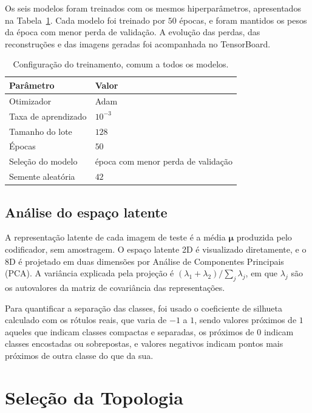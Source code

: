 \documentclass[11pt,a4paper]{article}
\begin{document}
Os seis modelos foram treinados com os mesmos hiperparâmetros, apresentados na
Tabela~\ref{tab:config}. Cada modelo foi treinado por $50$ épocas, e foram
mantidos os pesos da época com menor perda de validação. A evolução das perdas, das reconstruções e das imagens geradas
foi acompanhada no TensorBoard.

\begin{table}[H]
  \centering
  \small
  \begin{tabular}{ll}
    \toprule
    Parâmetro & Valor \\
    \midrule
    Otimizador & Adam \\
    Taxa de aprendizado & $10^{-3}$ \\
    Tamanho do lote & $128$ \\
    Épocas & $50$ \\
    Seleção do modelo & época com menor perda de validação \\
    Semente aleatória & $42$ \\
    \bottomrule
  \end{tabular}
  \caption{Configuração do treinamento, comum a todos os modelos.}
  \label{tab:config}
\end{table}

\subsection{Análise do espaço latente}

A representação latente de cada imagem de teste é a média $\boldsymbol{\mu}$
produzida pelo codificador, sem amostragem. O espaço latente 2D é visualizado
diretamente, e o 8D é projetado em duas dimensões por Análise de Componentes
Principais (PCA). A variância explicada pela projeção é
$(\lambda_1 + \lambda_2)/\sum_j \lambda_j$, em que $\lambda_j$ são os autovalores
da matriz de covariância das representações.

Para quantificar a separação das
classes, foi usado o coeficiente de silhueta calculado com os rótulos reais, que
varia de $-1$ a $1$, sendo valores próximos de $1$ aqueles que indicam classes compactas e
separadas, os próximos de $0$ indicam classes encostadas ou sobrepostas, e valores
negativos indicam pontos mais próximos de outra classe do que da sua.

\section{Seleção da Topologia}
\end{document}
